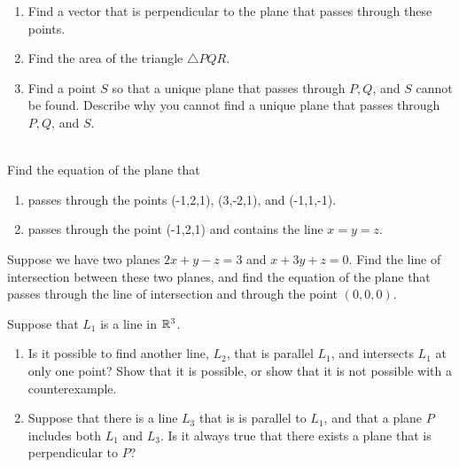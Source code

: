 \begin{enumerate}
\item Find a vector that is perpendicular to the plane that passes through these points.
\item Find the area of the triangle $\bigtriangleup PQR$.
\item Find a point $S$ so that a unique plane that passes through $P, Q$, and $S$ cannot be found. Describe why you cannot find a unique plane that passes through $P, Q$, and $S$. 
\end{enumerate}
\item %
\\
Find the equation of the plane that
\begin{enumerate}
\item passes through the points (-1,2,1), (3,-2,1), and (-1,1,-1).
\item passes through the point (-1,2,1) and contains the line $x=y=z$.
\end{enumerate}
\item %
Suppose we have two planes $2x+y-z=3$ and $x+3y+z=0$. Find the line of intersection between these two planes, and find the equation of the plane that passes through the line of intersection and through the point $(0,0,0)$.
\item %
Suppose that $L_1$ is a line in $\mathbb{R}^3$.
\begin{enumerate}
\item Is it possible to find another line, $L_2$, that is parallel $L_1$, and intersects $L_1$ at only one point? Show that it is  possible, or show that it is not possible with a counterexample.
\item Suppose that there is a line $L_3$ that is is parallel to $L_1$, and that a plane $P$ includes both $L_1$ and $L_3$. Is it always true that there exists a plane that is perpendicular to $P$? 
\end{enumerate}
